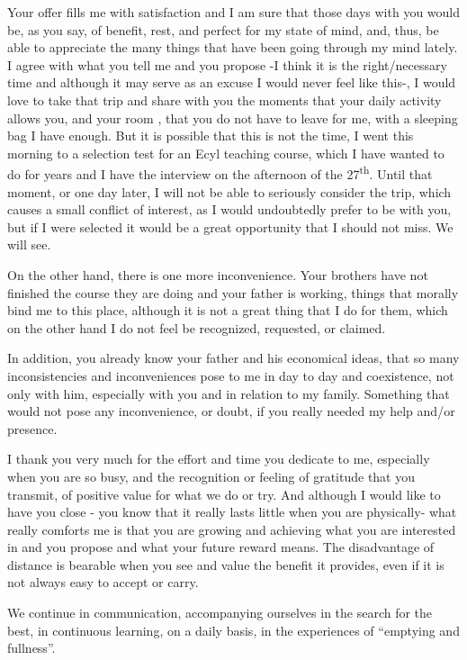 \documentclass[]{book}
\begin{document}
Your offer fills me with satisfaction and I am sure that those days with you would be, as you say, of benefit, rest, and perfect for my state of mind, and, thus, be able to appreciate the many things that have been going through my mind lately. I agree with what you tell me and you propose -I think it is the right/necessary time and although it may serve as an excuse I would never feel like this-, I would love to take that trip and share with you the moments that your daily activity allows you, and your room , that you do not have to leave for me, with a sleeping bag I have enough. But it is possible that this is not the time, I went this morning to a selection test for an Ecyl teaching course, which I have wanted to do for years and I have the interview on the afternoon of the 27\textsuperscript{th}. Until that moment, or one day later, I will not be able to seriously consider the trip, which causes a small conflict of interest, as I would undoubtedly prefer to be with you, but if I were selected it would be a great opportunity that I should not miss. We will see.

On the other hand, there is one more inconvenience. Your brothers have not finished the course they are doing and your father is working, things that morally bind me to this place, although it is not a great thing that I do for them, which on the other hand I do not feel be recognized, requested, or claimed.

In addition, you already know your father and his economical ideas, that so many inconsistencies and inconveniences pose to me in day to day and coexistence, not only with him, especially with you and in relation to my family. Something that would not pose any inconvenience, or doubt, if you really needed my help and/or presence.

I thank you very much for the effort and time you dedicate to me, especially when you are so busy, and the recognition or feeling of gratitude that you transmit, of positive value for what we do or try. And although I would like to have you close - you know that it really lasts little when you are physically- what really comforts me is that you are growing and achieving what you are interested in and you propose and what your future reward means. The disadvantage of distance is bearable when you see and value the benefit it provides, even if it is not always easy to accept or carry.

We continue in communication, accompanying ourselves in the search for the best, in continuous learning, on a daily basis, in the experiences of ``emptying and fullness''.
\end{document}

